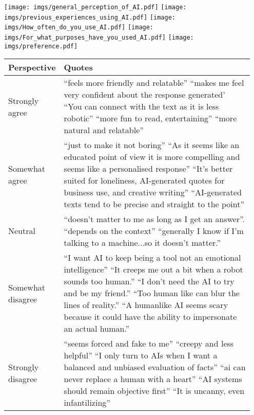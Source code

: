 \documentclass[11pt]{article}
\newcommand{\ant}{anthropomorphism\xspace}
\begin{document}
\begin{figure*}[th]
    \centering
    \texttt{[image: imgs/general\_perception\_of\_AI.pdf]}
    \texttt{[image: imgs/previous\_experiences\_using\_AI.pdf]}
    \texttt{[image: imgs/How\_often\_do\_you\_use\_AI.pdf]}
        \texttt{[image: imgs/For\_what\_purposes\_have\_you\_used\_AI.pdf]}
        \texttt{[image: imgs/preference.pdf]}
    \caption{Participants' responses to survey questions about their attitudes toward AI, their usage of AI, and their preferences regarding \ant.}
    \label{fig:stats}
\end{figure*}

\begin{table*}[th]\scriptsize
\begin{tabular}{|p{0.1\linewidth}|p{0.85\linewidth}|}\hline
\textbf{Perspective}&\textbf{Quotes}\\\hline
Strongly agree    &   ``feels more friendly and relatable'' ``makes me feel very confident about the response generated' ``You can connect with the text as it is less robotic'' ``more fun to read, entertaining''      ``more natural and relatable''                   \\\hline
Somewhat agree    & ``just to make it not boring'' ``As it seems like an educated point of view it is more compelling and seems like a personalised response'' ``It's better suited for loneliness, AI-generated quotes for business use, and creative writing''          ``AI-generated texts tend to be precise and straight to the point''                                                                                             \\\hline
Neutral           & ``doesn't matter to me as long as I get an answer''. ``depends on the context'' ``generally I know if I'm talking to a machine...so it doesn't matter.''  \\\hline
Somewhat disagree & ``I want AI to keep being a tool not an emotional intelligence'' ``It creeps me out a bit when a robot sounds too human.'' ``I don't need the AI to try and be my friend.'' ``Too human like can blur the lines of reality.'' ``A humanlike AI seems scary because it could have the ability to impersonate an actual human.''                                \\\hline
Strongly disagree & ``seems forced and fake to me'' ``creepy and less helpful'' ``I only turn to AIs when I want a balanced and unbiased evaluation of facts'' ``ai can never replace a human with a heart'' ``AI systems should remain objective first'' ``It is uncanny, even infantilizing''\\\hline
\end{tabular}
\caption{Participants' responses about their preferences regarding humanlike text.}\label{tab:prefquotes}
\end{table*}
\end{document}
